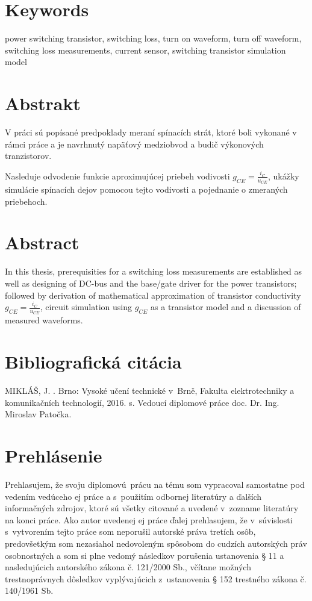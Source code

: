 \section*{Keywords}
power switching transistor, switching loss, turn on waveform, turn off waveform, switching loss measurements, current sensor, switching transistor simulation model

\newpage
\thispagestyle{empty}
\section*{Abstrakt}
V práci sú popísané predpoklady meraní spínacích strát, ktoré boli vykonané v rámci práce a je navrhnutý napäťový medziobvod a budič výkonových tranzistorov.

Nasleduje odvodenie funkcie aproximujúcej priebeh vodivosti $g_{CE} = \frac{i_C}{u_{CE}}$, ukážky simulácie spínacích dejov pomocou tejto vodivosti a pojednanie o zmeraných priebehoch.

\paragraph{}


\section*{Abstract}
In this thesis, prerequisities for a switching loss measurements  are established as well as designing of DC-bus and the base/gate driver for the power transistors; followed by derivation of  mathematical approximation of transistor conductivity $g_{CE} = \frac{i_C}{u_{CE}}$, circuit simulation using $g_{CE}$ as a transistor model and a discussion of measured waveforms.



\newpage
\thispagestyle{empty}
\section*{Bibliografická citácia}
MIKLÁŠ, J. \nazov. Brno: Vysoké učení technické v~Brně, Fakulta elektrotechniky a komunikačních technologií, 2016. \pageref{LastPage} s. Vedoucí diplomové práce doc. Dr. Ing. Miroslav Patočka.

\newpage
\thispagestyle{empty}
\section*{Prehlásenie}

Prehlasujem, že svoju diplomovú~prácu na tému \nazov som vypracoval samostatne pod vedením vedúceho \typprace ej práce a s~použitím odbornej literatúry a ďalších informačných zdrojov, ktoré sú všetky citované a uvedené v~zozname literatúry na konci práce.
Ako autor uvedenej \typprace ej práce ďalej prehlasujem, že v~súvislosti s~vytvorením tejto práce som neporušil autorské práva tretích osôb, predovšetkým som nezasiahol nedovoleným spôsobom do cudzích autorských práv osobnostných a som si plne vedomý následkov porušenia ustanovenia § 11 a nasledujúcich autorského zákona č. 121/2000 Sb., včítane  možných
trestnoprávnych dôsledkov vyplývajúcich z~ustanovenia § 152 trestného zákona č. 140/1961 Sb.

